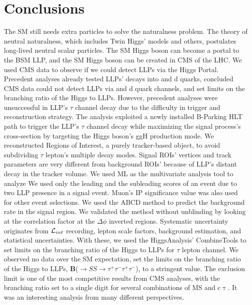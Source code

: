 \clearpage
\chapter{Conclusions}\label{sec:conclusions}
The SM still needs extra particles to solve the naturalness problem.
The theory of neutral naturalness, which includes Twin Higgs' models and others, postulates long-lived neutral scalar particles.
The SM Higgs boson can become a portal to the BSM LLP, and the SM Higgs boson can be created in CMS of the LHC.
We used CMS data to observe if we could detect LLPs via the Higgs Portal.
Precedent analyses already tested LLPs' decays into \PQb and d quarks, concluded CMS data could not detect LLPs via \PQb and d quark channels, and set limits on the branching ratio of the Higgs to LLPs.
However, precedent analyses were unsuccessful in LLP's $\tau$ channel decay due to the difficulty in trigger and reconstruction strategy.
The analysis exploited a newly installed B-Parking HLT path to trigger the LLP's $\tau$ channel decay while maximizing the signal process's cross-section by targeting the Higgs boson's ggH production mode.
We reconstructed Regions of Interest, a purely tracker-based object, to avoid subdividing $\tau$ lepton's multiple decay modes.
Signal ROIs' vertices and track parameters are very different from background ROIs' because of LLP's distant decay in the tracker volume.
We used ML as the multivariate analysis tool to analyze
We used only the leading and the subleading scores of an event due to two LLP presence in a signal event.
Muon's IP significance value was also used for other event selections.
We used the ABCD method to predict the background rate in the signal region.
We validated the method without unblinding by looking at the correlation factor at the $\Delta\phi$ inverted regions.
Systematic uncertainty originates from $\mathcal{L}_{int}$ recording, lepton scale factors, background estimation, and statistical uncertainties.
With these, we used the HiggsAnalysis' CombineTools to set limits on the branching ratio of the Higgs to LLPs for $\tau$ lepton channel.
We observed no data over the SM expectation, set the limits on the branching ratio of the Higgs to LLPs, \textbf{B}(\PH$\to SS \to \tau^{+}\tau^{-}\tau^{+}\tau^{-}$), to a stringent value.
The exclusion limit is one of the most competitive results from CMS analyses, with the branching ratio set to a single digit for several combinations of MS and c$\uptau$.
It was an interesting analysis from many different perspectives.

